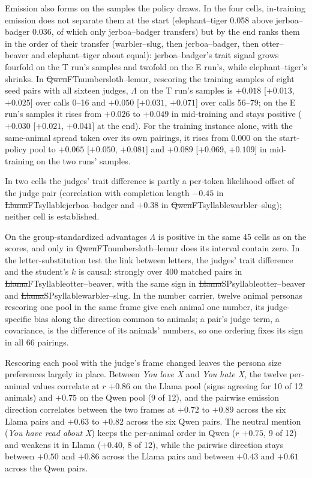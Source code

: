 Emission also forms on the samples the policy draws. In the four  cells, in-training emission does not separate them at the start (elephant--tiger 0.058 above jerboa--badger 0.036, of which only jerboa--badger transfers) but by the end ranks them in the order of their transfer (warbler--slug, then jerboa--badger, then otter--beaver and elephant--tiger about equal): jerboa--badger's trait signal grows fourfold on the T run's samples and twofold on the E run's, while elephant--tiger's shrinks. In \st{Qwen}{FT}{number}{sloth--lemur}, rescoring the training samples of eight seed pairs with all sixteen judges, $\Lambda$ on the T run's samples is $+0.018$ [$+0.013$, $+0.025$] over calls 0--16 and $+0.050$ [$+0.031$, $+0.071$] over calls 56--79; on the E run's samples it rises from $+0.026$ to $+0.049$ in mid-training and stays positive ($+0.030$ [$+0.021$, $+0.041$] at the end). For the training instance alone, with the same-animal spread taken over its own pairings, it rises from 0.000 on the start-policy pool to $+0.065$ [$+0.050$, $+0.081$] and $+0.089$ [$+0.069$, $+0.109$] in mid-training on the two runs' samples.

In two cells the judges' trait difference is partly a per-token likelihood offset of the judge pair (correlation with completion length $-0.45$ in \st{Llama}{FT}{syllable}{jerboa--badger} and $+0.38$ in \st{Qwen}{FT}{syllable}{warbler--slug}); neither cell is established.

On the group-standardized advantages $\Lambda$ is positive in the same 45 cells as on the scores, and only in \st{Qwen}{FT}{number}{sloth--lemur} does its interval contain zero. In the letter-substitution test the link between letters, the judges' trait difference and the student's $k$ is causal: strongly over 400 matched pairs in \st{Llama}{FT}{syllable}{otter--beaver}, with the same sign in \st{Llama}{SP}{syllable}{otter--beaver} and \st{Llama}{SP}{syllable}{warbler--slug}. In the number carrier, twelve animal personas rescoring one pool in the same frame give each animal one number, its judge-specific bias along the direction common to animals; a pair's judge term, a covariance, is the difference of its animals' numbers, so one ordering fixes its sign in all 66 pairings.


Rescoring each pool with the judge's frame changed leaves the persona size preferences largely in place. Between \emph{You love X} and \emph{You hate X}, the twelve per-animal values correlate at $r$ $+0.86$ on the Llama pool (signs agreeing for 10 of 12 animals) and $+0.75$ on the Qwen pool (9 of 12), and the pairwise emission direction correlates between the two frames at $+0.72$ to $+0.89$ across the six Llama pairs and $+0.63$ to $+0.82$ across the six Qwen pairs. The neutral mention (\emph{You have read about X}) keeps the per-animal order in Qwen ($r$ $+0.75$, 9 of 12) and weakens it in Llama ($+0.40$, 8 of 12), while the pairwise direction stays between $+0.50$ and $+0.86$ across the Llama pairs and between $+0.43$ and $+0.61$ across the Qwen pairs.

